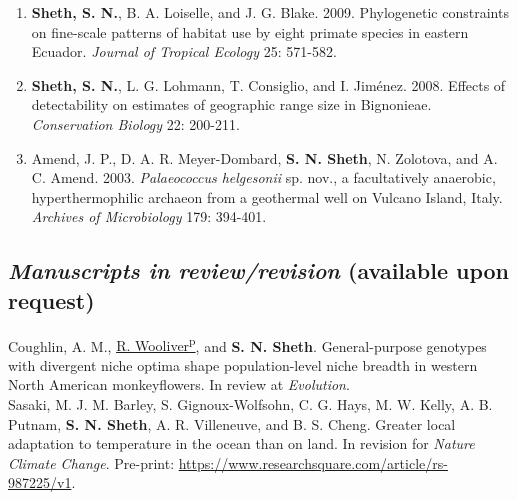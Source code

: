\documentclass[11pt,english]{article}\usepackage[]{graphicx}\usepackage[]{color}
\providecommand{\tabularnewline}{\\}
\begin{document}
\begin{hangparas}{.5in}{1}
\begin{enumerate}
\item \textbf{Sheth, S. N.}, B. A. Loiselle, and J. G. Blake. 2009. Phylogenetic constraints on fine-scale patterns of habitat use by eight primate species in eastern Ecuador. \emph{Journal of Tropical Ecology} 25: 571-582. 

\item \textbf{Sheth, S. N.}, L. G. Lohmann, T. Consiglio, and I. Jim\'enez. 2008. Effects of detectability on estimates of geographic range size in Bignonieae. \emph{Conservation Biology} 22: 200-211. 

\item Amend, J. P., D. A. R. Meyer-Dombard, \textbf{S. N. Sheth}, N. Zolotova, and A. C. Amend. 2003. \textit{Palaeococcus helgesonii} sp. nov., a facultatively anaerobic, hyperthermophilic archaeon from a geothermal well on Vulcano Island, Italy. \emph{Archives of Microbiology} 179: 394-401. 
\end{enumerate}
\end{hangparas}

\subsection*{\textit{Manuscripts in review/revision} (available upon request)} 

\begin{hangparas}{.5in}{1}

Coughlin, A. M., \underline{R. Wooliver\textsuperscript{p}}, and \textbf{S. N. Sheth}. General-purpose genotypes with divergent niche optima shape population-level niche breadth in western North American monkeyflowers. In review at \emph{Evolution}. \tabularnewline

Sasaki, M. J. M. Barley, S. Gignoux-Wolfsohn, C. G. Hays, M. W. Kelly, A. B. Putnam, \textbf{S. N. Sheth}, A. R. Villeneuve, and B. S. Cheng. Greater local adaptation to temperature in the ocean than on land. In revision for \emph{Nature Climate Change}. Pre-print: \url{https://www.researchsquare.com/article/rs-987225/v1}. \tabularnewline


\end{hangparas}
\end{document}
